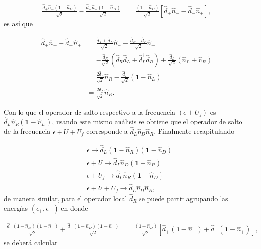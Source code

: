 \begin{appendixs}
\begin{align*}
    \frac{\hat{d}_{+}\hat{n}_{-}(\textbf{1}-\hat{n}_{D})}{\sqrt{2}} - \frac{\hat{d}_{-}\hat{n}_{+}(\textbf{1}-\hat{n}_{D})}{\sqrt{2}} & = \frac{(\textbf{1}-\hat{n}_{D})}{\sqrt{2}}[\hat{d}_{+}\hat{n}_{-} -\hat{d}_{-}\hat{n}_{+}],
\end{align*}
es así que

\begin{align*}
    \hat{d}_{+}\hat{n}_{-} -\hat{d}_{-}\hat{n}_{+} & = \frac{\hat{d}_{R}+\hat{d}_{L}}{\sqrt{2}}\hat{n}_{-} - \frac{\hat{d}_{R}-\hat{d}_{L}}{\sqrt{2}}\hat{n}_{+} \\
    & = - \frac{\hat{d}_{R}}{\sqrt{2}}(\hat{d}^{\dagger}_{R}\hat{d}_{L}+ \hat{d}^{\dagger}_{L}\hat{d}_{R}) + \frac{\hat{d}_{L}}{\sqrt{2}}(\hat{n}_{L}+\hat{n}_{R}) \\
    & = \frac{2\hat{d}_{L}}{\sqrt{2}}\hat{n}_{R} - \frac{\hat{d}_{L}}{\sqrt{2}}(\textbf{1}-\hat{n}_{L}) \\
    & = \frac{2\hat{d}_{L}}{\sqrt{2}}\hat{n}_{R}.
\end{align*}

Con lo que el operador de salto respectivo a la frecuencia $(\epsilon+U_{f})$ es $\hat{d}_{L}\hat{n}_{R}(\textbf{1}-\hat{n}_{D})$, usando este mismo análisis se obtiene que el operador de salto de la frecuencia $\epsilon+U+U_{f}$ corresponde a $\hat{d}_{L}\hat{n}_{D}\hat{n}_{R}$. Finalmente recapitulando

\begin{align*}
    &\epsilon \to \hat{d}_{L}(\textbf{1}-\hat{n}_{R})(\textbf{1}-\hat{n}_{D})\\
   &\epsilon + U \to \hat{d}_{L}\hat{n}_{D}(\textbf{1}-\hat{n}_{R})\\
    &\epsilon +U_{f}\to \hat{d}_{L}\hat{n}_{R}(\textbf{1}-\hat{n}_{D})\\
    &\epsilon +U+U_{f}\to \hat{d}_{L}\hat{n}_{D}\hat{n}_{R},
\end{align*}
de manera similar, para el operador local $\hat{d}_{R}$ se puede partir agrupando las energías $(\epsilon_{+},\epsilon_{-})$ en donde

\begin{align*}
    \frac{\hat{d}_{+}(\textbf{1}-\hat{n}_{D})(\textbf{1}-\hat{n}_{-}) }{\sqrt{2}} + \frac{\hat{d}_{-}(\textbf{1}-\hat{n}_{D})(\textbf{1}-\hat{n}_{+}) }{\sqrt{2}} & = \frac{(\textbf{1} - \hat{n}_{D})}{\sqrt{2}}[\hat{d}_{+}(\textbf{1}-\hat{n}_{-}) + \hat{d}_{-}(\textbf{1}-\hat{n}_{+})],
\end{align*}
se deberá calcular 


\end{appendixs}
